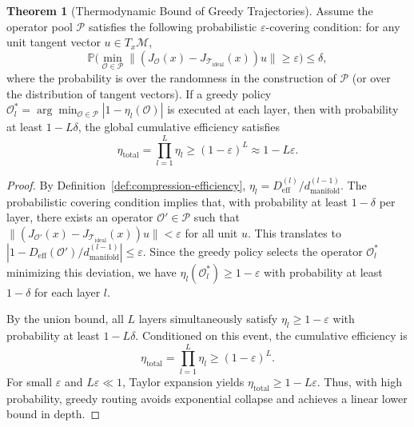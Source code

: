 \documentclass[11pt, a4paper]{article}
\theoremstyle{definition}
\newtheorem{theorem}{Theorem}[section]
\begin{document}
\begin{theorem}[Thermodynamic Bound of Greedy Trajectories]
\label{thm:greedy-markov-bound}
Assume the operator pool $\mathcal{P}$ satisfies the following probabilistic $\varepsilon$-covering condition: for any unit tangent vector $u \in T_x\mathcal{M}$,
\begin{equation}
\mathbb{P}\Big( \min_{\mathcal{O} \in \mathcal{P}} \| (J_{\mathcal{O}}(x) - J_{\mathcal{T}_{\text{ideal}}}(x)) u \| \ge \varepsilon \Big) \le \delta,
\end{equation}
where the probability is over the randomness in the construction of $\mathcal{P}$ (or over the distribution of tangent vectors). If a greedy policy $\mathcal{O}_l^* = \arg\min_{\mathcal{O} \in \mathcal{P}} |1 - \eta_l(\mathcal{O})|$ is executed at each layer, then with probability at least $1 - L\delta$, the global cumulative efficiency satisfies
\begin{equation}
\eta_{\text{total}} = \prod_{l=1}^L \eta_l \ge (1 - \varepsilon)^L \approx 1 - L\varepsilon.
\end{equation}
\end{theorem}

\begin{proof}
By Definition~\ref{def:compression-efficiency}, $\eta_l = D_{\text{eff}}^{(l)} / d_{\text{manifold}}^{(l-1)}$. The probabilistic covering condition implies that, with probability at least $1-\delta$ per layer, there exists an operator $\mathcal{O}' \in \mathcal{P}$ such that $\| (J_{\mathcal{O}'}(x) - J_{\mathcal{T}_{\text{ideal}}}(x)) u \| < \varepsilon$ for all unit $u$. This translates to $|1 - D_{\text{eff}}(\mathcal{O}')/d_{\text{manifold}}^{(l-1)}| \le \varepsilon$. Since the greedy policy selects the operator $\mathcal{O}_l^*$ minimizing this deviation, we have $\eta_l(\mathcal{O}_l^*) \ge 1 - \varepsilon$ with probability at least $1-\delta$ for each layer $l$.

By the union bound, all $L$ layers simultaneously satisfy $\eta_l \ge 1 - \varepsilon$ with probability at least $1 - L\delta$. Conditioned on this event, the cumulative efficiency is
\begin{equation}
\eta_{\text{total}} = \prod_{l=1}^L \eta_l \ge (1 - \varepsilon)^L.
\end{equation}
For small $\varepsilon$ and $L\varepsilon \ll 1$, Taylor expansion yields $\eta_{\text{total}} \ge 1 - L\varepsilon$.
Thus, with high probability, greedy routing avoids exponential collapse and achieves a linear lower bound in depth.
\end{proof}
\end{document}
